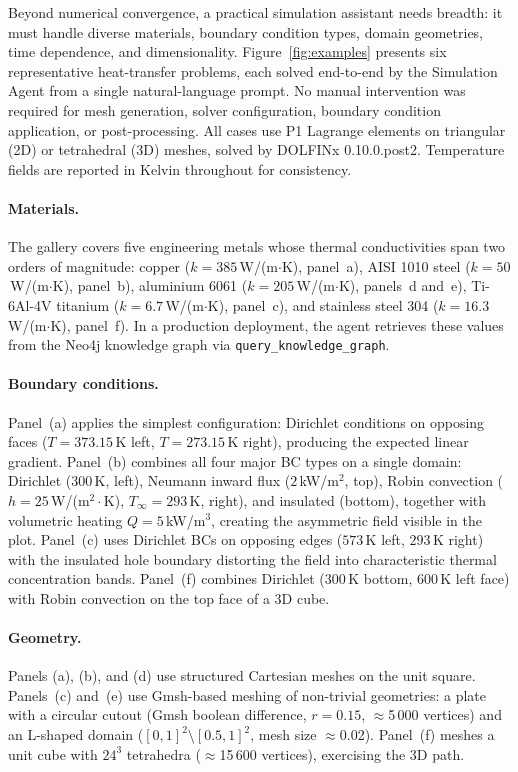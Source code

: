 \documentclass[twocolumn]{article}
\begin{document}
Beyond numerical convergence, a practical simulation assistant needs
breadth: it must handle diverse materials, boundary
condition types, domain geometries, time dependence, and dimensionality.
Figure~\ref{fig:examples} presents six representative heat-transfer
problems, each solved end-to-end by the Simulation Agent from a single
natural-language prompt.  No manual intervention was required for mesh
generation, solver configuration, boundary condition application, or
post-processing.  All cases use P1 Lagrange elements on triangular
(2D) or tetrahedral (3D) meshes, solved by DOLFINx 0.10.0.post2.
Temperature fields are reported in Kelvin throughout for consistency.

\paragraph{Materials.}
The gallery covers five engineering metals whose thermal
conductivities span two orders of magnitude:
copper ($k=385$\,W/(m$\cdot$K), panel~a),
AISI 1010 steel ($k=50$\,W/(m$\cdot$K), panel~b),
aluminium 6061 ($k=205$\,W/(m$\cdot$K), panels~d and~e),
Ti-6Al-4V titanium ($k=6.7$\,W/(m$\cdot$K), panel~c),
and stainless steel 304 ($k=16.3$\,W/(m$\cdot$K), panel~f).
In a production deployment, the agent retrieves these values from the
Neo4j knowledge graph via \texttt{query\_knowledge\_graph}.

\paragraph{Boundary conditions.}
Panel~(a) applies the simplest configuration: Dirichlet conditions on
opposing faces ($T=373.15$\,K left, $T=273.15$\,K right), producing
the expected linear gradient.  Panel~(b) combines all four major
BC types on a single domain: Dirichlet ($300$\,K, left), Neumann
inward flux ($2$\,kW/m$^2$, top), Robin convection ($h=25$\,W/(m$^2
\cdot$K), $T_\infty=293$\,K, right), and insulated (bottom), together
with volumetric heating $Q=5$\,kW/m$^3$, creating the asymmetric
field visible in the plot.  Panel~(c) uses Dirichlet BCs on opposing
edges ($573$\,K left, $293$\,K right) with the insulated hole boundary
distorting the field into characteristic thermal concentration bands.
Panel~(f) combines Dirichlet ($300$\,K bottom, $600$\,K left face)
with Robin convection on the top face of a 3D cube.

\paragraph{Geometry.}
Panels (a), (b), and (d) use structured Cartesian meshes on the
unit square.  Panels~(c) and~(e) use Gmsh-based meshing
of non-trivial geometries: a plate with a circular cutout
(Gmsh boolean difference, $r=0.15$, $\approx$5\,000 vertices) and
an L-shaped domain ($[0,1]^2 \setminus [0.5,1]^2$, mesh size
$\approx$0.02).  Panel~(f) meshes a unit cube with $24^3$
tetrahedra ($\approx$15\,600 vertices), exercising the 3D path.
\end{document}
